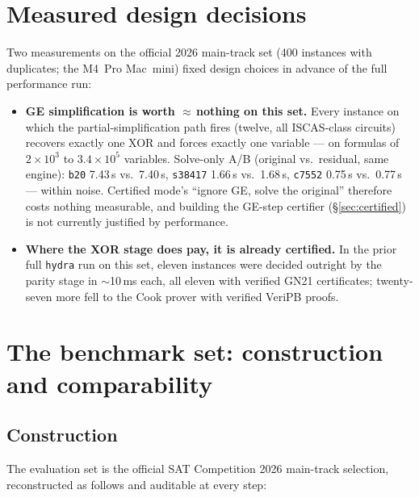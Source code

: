 \documentclass[10pt]{article}
\begin{document}
\section{Measured design decisions}
\label{sec:ge-value}

Two measurements on the official 2026 main-track set (400 instances
with duplicates; the M4~Pro Mac~mini) fixed design choices in advance of the
full performance run:

\begin{itemize}
\item \textbf{GE simplification is worth $\approx$\,nothing on this
  set.} Every instance on which the partial-simplification path fires
  (twelve, all ISCAS-class circuits) recovers exactly one XOR and
  forces exactly one variable --- on formulas of $2\times 10^3$ to
  $3.4\times 10^5$ variables. Solve-only A/B (original vs.\ residual,
  same engine): \texttt{b20} 7.43\,s vs.\ 7.40\,s, \texttt{s38417}
  1.66\,s vs.\ 1.68\,s, \texttt{c7552} 0.75\,s vs.\ 0.77\,s ---
  within noise. Certified mode's ``ignore GE, solve the original''
  therefore costs nothing measurable, and building the GE-step
  certifier (\S\ref{sec:certified}) is not currently justified by
  performance.
\item \textbf{Where the XOR stage does pay, it is already certified.}
  In the prior full \texttt{hydra} run on this set, eleven instances
  were decided outright by the parity stage in $\sim$10\,ms each, all
  eleven with verified GN21 certificates; twenty-seven more fell to
  the Cook prover with verified VeriPB proofs.
\end{itemize}

\section{The benchmark set: construction and comparability}
\label{sec:benchset}

\subsection{Construction}
\label{sec:benchset-construction}

The evaluation set is the official SAT Competition 2026 main-track
selection, reconstructed as follows and auditable at every step:
\end{document}
